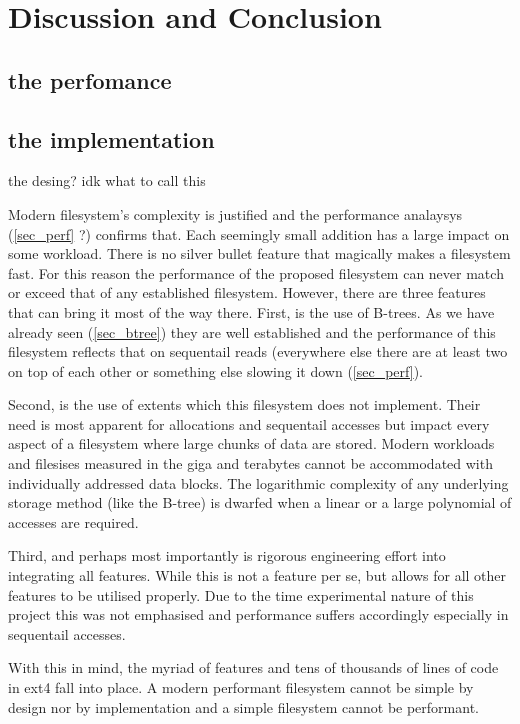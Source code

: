 \chapter{Discussion and Conclusion}

    \section{the perfomance}
    \section{the implementation}
    the desing? idk what to call this

        Modern filesystem's complexity is justified and the performance
        analaysys (\ref{sec_perf} ?) confirms that. Each seemingly small
        addition has a large impact on some workload. There is no silver bullet
        feature that magically makes a filesystem fast. For this reason the
        performance of the proposed filesystem can never match or exceed that
        of any established filesystem. However, there are three features that
        can bring it most of the way there. First, is the use of B-trees. As we
        have already seen (\ref{sec_btree}) they are well established and the
        performance of this filesystem reflects that on sequentail reads
        (everywhere else there are at least two on top of each other or
        something else slowing it down (\ref{sec_perf}).

        Second, is the use of extents which this filesystem does not implement.
        Their need is most apparent for allocations and sequentail accesses but
        impact every aspect of a filesystem where large chunks of data are
        stored. Modern workloads and filesises measured in the giga and
        terabytes cannot be accommodated with individually addressed data
        blocks. The logarithmic complexity of any underlying storage method
        (like the B-tree) is dwarfed when a linear or a large polynomial of
        accesses are required.

        Third, and perhaps most importantly is rigorous engineering effort into
        integrating all features. While this is not a feature per se, but
        allows for all other features to be utilised properly. Due to the time
        experimental nature of this project this was not emphasised and
        performance suffers accordingly especially in sequentail accesses.

        With this in mind, the myriad of features and tens of thousands of
        lines of code in ext4 fall into place. A modern performant filesystem
        cannot be simple by design nor by implementation and a simple
        filesystem cannot be performant.

